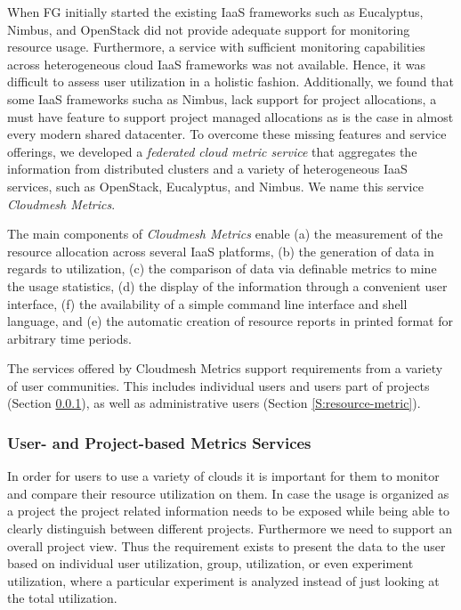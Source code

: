 \documentclass{tex/sig-alternate-2013}
\newcommand{\todo}[1]{{\color{red}{#1}}}
\begin{document}
{When FG initially started the existing IaaS frameworks such as Eucalyptus, Nimbus, and OpenStack did not provide adequate support for monitoring resource usage. Furthermore, a service with sufficient monitoring capabilities across heterogeneous cloud IaaS frameworks was not available. Hence, it was difficult to assess user utilization in a holistic fashion. Additionally, we found that some IaaS frameworks sucha as Nimbus, lack support for project allocations, a must have feature to support project managed allocations as is the case in almost every modern shared datacenter.  To overcome these missing features and service offerings, we developed a {\em federated cloud metric service} that aggregates the information from distributed clusters and a variety of heterogeneous IaaS services, such as OpenStack, Eucalyptus, and Nimbus. We name this service {\em Cloudmesh Metrics}.

The main components of {\em Cloudmesh Metrics} enable (a) the measurement of the resource allocation across several IaaS platforms, (b) the generation of data in regards to utilization, (c) the comparison of data via definable metrics to mine the usage statistics, (d) the display of the information through a convenient user interface, (f) the availability of a simple command line interface and shell language, and (e) the automatic creation of resource reports in printed format for arbitrary time periods.

The services offered by Cloudmesh Metrics support requirements from a variety of user communities. This includes individual users and users part of projects (Section \ref{S:user-metric}), as well as administrative users (Section \ref{S:resource-metric}).


\subsubsection{User- and Project-based Metrics Services}\label{S:user-metric} 

\todo{READ}

In order for users to use a variety of clouds it is important for them to monitor and compare their resource utilization on them. In case the usage is organized as a project the project related information needs to be exposed while being able to clearly distinguish between different projects. Furthermore we need to support an overall project view.  Thus the requirement exists to present the data to the user based on individual user utilization, group, utilization, or even experiment utilization, where a particular experiment is analyzed instead of just looking at the total utilization.

}
\end{document}
